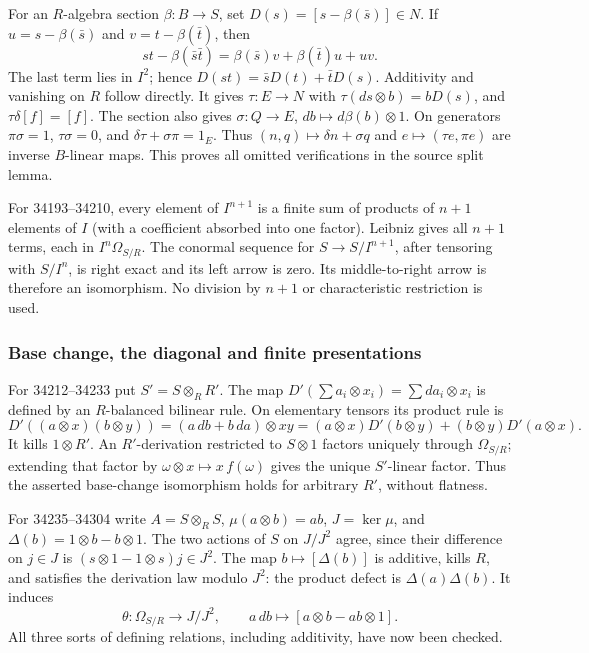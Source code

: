 For an \(R\)-algebra section \(\beta:B\to S\), set \(D(s)=[s-\beta(\bar s)]\in N\). If \(u=s-\beta(\bar s)\) and \(v=t-\beta(\bar t)\), then \[
st-\beta(\bar s\bar t)=\beta(\bar s)v+\beta(\bar t)u+uv.
\] The last term lies in \(I^2\); hence \(D(st)=\bar sD(t)+\bar tD(s)\). Additivity and vanishing on \(R\) follow directly. It gives \(\tau:E\to N\) with \(\tau(ds\otimes b)=bD(s)\), and \(\tau\delta[f]=[f]\). The section also gives \(\sigma:Q\to E\), \(db\mapsto d\beta(b)\otimes1\). On generators \(\pi\sigma=1\), \(\tau\sigma=0\), and \(\delta\tau+\sigma\pi=1_E\). Thus \((n,q)\mapsto\delta n+\sigma q\) and \(e\mapsto(\tau e,\pi e)\) are inverse \(B\)-linear maps. This proves all omitted verifications in the source split lemma.

For 34193--34210, every element of \(I^{n+1}\) is a finite sum of products of \(n+1\) elements of \(I\) (with a coefficient absorbed into one factor). Leibniz gives all \(n+1\) terms, each in \(I^n\Omega_{S/R}\). The conormal sequence for \(S\to S/I^{n+1}\), after tensoring with \(S/I^n\), is right exact and its left arrow is zero. Its middle-to-right arrow is therefore an isomorphism. No division by \(n+1\) or characteristic restriction is used.

\subsubsection{Base change, the diagonal and finite presentations}\label{base-change-the-diagonal-and-finite-presentations}

For 34212--34233 put \(S'=S\otimes_R R'\). The map \(D'(\sum a_i\otimes x_i)=\sum da_i\otimes x_i\) is defined by an \(R\)-balanced bilinear rule. On elementary tensors its product rule is \[
D'((a\otimes x)(b\otimes y))=(a\,db+b\,da)\otimes xy
=(a\otimes x)D'(b\otimes y)+(b\otimes y)D'(a\otimes x).
\] It kills \(1\otimes R'\). An \(R'\)-derivation restricted to \(S\otimes1\) factors uniquely through \(\Omega_{S/R}\); extending that factor by \(\omega\otimes x\mapsto x\,f(\omega)\) gives the unique \(S'\)-linear factor. Thus the asserted base-change isomorphism holds for arbitrary \(R'\), without flatness.

For 34235--34304 write \(A=S\otimes_R S\), \(\mu(a\otimes b)=ab\), \(J=\ker\mu\), and \(\Delta(b)=1\otimes b-b\otimes1\). The two actions of \(S\) on \(J/J^2\) agree, since their difference on \(j\in J\) is \((s\otimes1-1\otimes s)j\in J^2\). The map \(b\mapsto[\Delta(b)]\) is additive, kills \(R\), and satisfies the derivation law modulo \(J^2\): the product defect is \(\Delta(a)\Delta(b)\). It induces \[
\theta:\Omega_{S/R}\longrightarrow J/J^2,\qquad a\,db\longmapsto[a\otimes b-ab\otimes1].
\] All three sorts of defining relations, including additivity, have now been checked.

